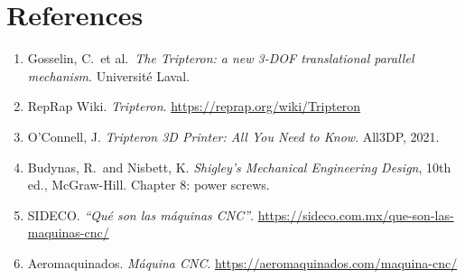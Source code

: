 \documentclass[11pt]{article}
\begin{document}
\section{References}

\begin{enumerate}[leftmargin=*,nosep]
  \item Gosselin, C.\ et al.\ \textit{The Tripteron: a new 3-DOF translational parallel
        mechanism}. Universit\'e Laval.
  \item RepRap Wiki. \textit{Tripteron}. \url{https://reprap.org/wiki/Tripteron}
  \item O'Connell, J. \textit{Tripteron 3D Printer: All You Need to Know}. All3DP, 2021.
  \item Budynas, R.\ and Nisbett, K. \textit{Shigley's Mechanical Engineering Design},
        10th ed., McGraw-Hill. Chapter 8: power screws.
  \item SIDECO. \textit{\textquotedblleft Qu\'e son las m\'aquinas CNC\textquotedblright}.
        \url{https://sideco.com.mx/que-son-las-maquinas-cnc/}
  \item Aeromaquinados. \textit{M\'aquina CNC}.
        \url{https://aeromaquinados.com/maquina-cnc/}
\end{enumerate}
\end{document}
